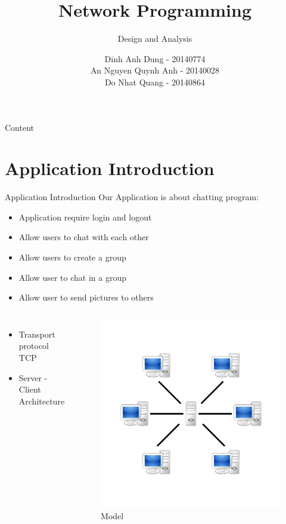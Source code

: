 \documentclass{beamer}
\title[Short Title]{Network Programming}
\subtitle{Design and Analysis}
\author{Dinh Anh Dung - 20140774 \\ An Nguyen Quynh Anh - 20140028 \\ Do Nhat Quang - 20140864}
\institute{\large \textbf{Hanoi University of Science and Technology}}
\date{}
\begin{document}
\begin{frame}
\titlepage
\end{frame}

\begin{frame}{Content}
	\tableofcontents
\end{frame}
\section{Application Introduction}
\begin{frame}{Application Introduction}
Our Application is about chatting program:

\begin{itemize}
\item Application require login and logout
\item Allow users to chat with each other
\item Allow users to create a group
\item Allow user to chat in a group
\item Allow user to send pictures to others
\end{itemize}
\end{frame}


\begin{frame}
\begin{columns}
\begin{itemize}
\item Transport protocol TCP
\item Server - Client Architecture
\end{itemize}
\begin{figure}
\includegraphics[scale=0.15]{1200px-Server-based-network.svg.png}
\caption{Model}
\end{figure}
\end{columns}
\end{frame}
\end{document}
